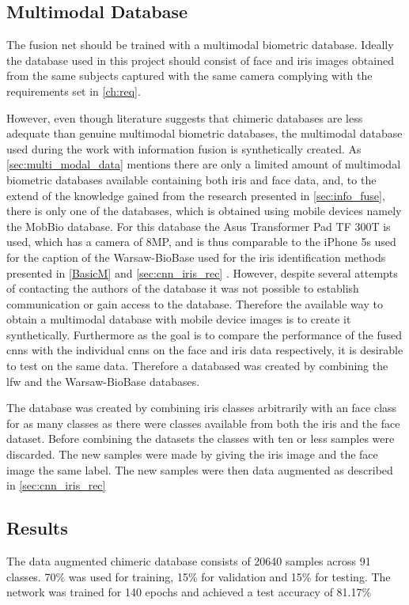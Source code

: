 \clearpage
\subsection{Multimodal Database}
The fusion net should be trained with a multimodal biometric database. Ideally the database used in this project should consist of face and iris images obtained from the same subjects captured with the same camera complying with the requirements set in \autoref{ch:req}. 

However, even though literature suggests that chimeric databases are less adequate than genuine multimodal biometric databases, the multimodal database used during the work with information fusion is synthetically created. As \autoref{sec:multi_modal_data} mentions there are only a limited amount of multimodal biometric databases available containing both iris and face data, and, to the extend of the knowledge gained from the research presented in \autoref{sec:info_fuse}, there is only one of the databases, which is obtained using mobile devices namely the MobBio database. For this database the Asus Transformer Pad TF 300T is used, which has a camera of 8MP, and is thus comparable to the iPhone 5s used for the caption of the Warsaw-BioBase used for the iris identification methods presented in \autoref{BasicM} and \autoref{sec:cnn_iris_rec} \citep{Sequeira2014}. However, despite several attempts of contacting the authors of the database it was not possible to establish communication or gain access to the database. Therefore the available way to obtain a multimodal database with mobile device images is to create it synthetically. Furthermore as the goal is to compare the performance of the fused \gls{cnn}s with the individual \gls{cnn}s on the face and iris data respectively, it is desirable to test on the same data. Therefore a databased was created by combining the \gls{lfw} and the Warsaw-BioBase databases. 

The database was created by combining iris classes arbitrarily with an face class for as many classes as there were classes available from both the iris and the face dataset. Before combining the datasets the classes with ten or less samples were discarded. The new samples were made by giving the iris image and the face image the same label. The new samples were then data augmented as described in \autoref{sec:cnn_iris_rec}

\subsection{Results}
The data augmented chimeric database consists of 20640 samples across 91 classes. 70\% was used for training, 15\% for validation and 15\% for testing. The network was trained for 140 epochs and achieved a test accuracy of 81.17\%

